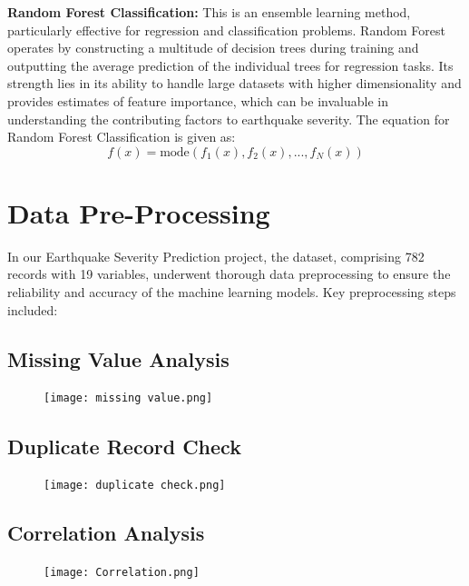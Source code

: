\documentclass{article}
\begin{document}
\textbf{Random Forest Classification:} This is an ensemble learning method, particularly effective for regression and classification problems. Random Forest operates by constructing a multitude of decision trees during training and outputting the average prediction of the individual trees for regression tasks. Its strength lies in its ability to handle large datasets with higher dimensionality and provides estimates of feature importance, which can be invaluable in understanding the contributing factors to earthquake severity. The equation for Random Forest Classification is given as: 
\[ f(x) = \text{mode}(f_1(x), f_2(x), ..., f_N(x)) \]

\vspace{1cm}




\section{Data Pre-Processing}
In our Earthquake Severity Prediction project, the dataset, comprising 782 records with 19 variables, underwent thorough data preprocessing to ensure the reliability and accuracy of the machine learning models. Key preprocessing steps included:

\subsection{ Missing Value Analysis}
\begin{figure}[H]
    \centering
    \texttt{[image: missing value.png]} 
    \vspace*{-0.5cm}
    \label{fig:eda}
\end{figure}

\subsection{Duplicate Record Check}
\begin{figure}[H]
    \centering
    \texttt{[image: duplicate check.png]} 
    \vspace*{-0.5cm}
    \label{fig:eda}
\end{figure}

\subsection{Correlation Analysis}
\begin{figure}[H]
    \centering
    \texttt{[image: Correlation.png]} 
    \vspace*{-0.5cm}
    \label{fig:eda}
\end{figure}
\end{document}

